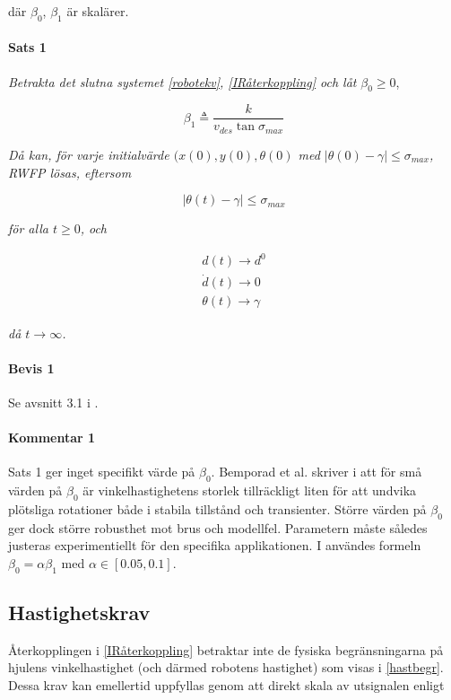 \documentclass[11pt]{article}
\begin{document}
\begin{flushleft}
där $\beta_0$, $\beta_1$ är skalärer.
	
\paragraph{Sats 1} \textit{Betrakta det slutna systemet \eqref{robotekv}, \eqref{IRåterkoppling} och låt} $\beta_0 \geq 0$,

\begin{equation}
	\beta_1 \triangleq \frac {k} {v_{des} \tan \sigma_{max}}
\end{equation}

\textit{Då kan, för varje initialvärde $(x(0), y(0), \theta(0)$ med $| \theta(0) - \gamma| \leq \sigma_{max}$,  RWFP lösas, eftersom}

\begin{equation}
	| \theta(t) - \gamma| \leq \sigma_{max}
\end{equation}

\textit{för alla $t \geq 0$, och}

\begin{equation}
\begin{aligned}
	d(t) \to d^0 \\
	\dot{d}(t) \to 0 \\ 
	\theta(t) \to \gamma 
\end{aligned}
\end{equation}

\textit{då $t \to \infty$.}

\paragraph{Bevis 1} Se avsnitt 3.1 i \cite{wfp}.

\paragraph{Kommentar 1} Sats 1 ger inget specifikt värde på $\beta_0$. Bemporad et al. skriver i \cite{wfp} att för små värden på $\beta_0$ är vinkelhastighetens storlek tillräckligt liten för att undvika plötsliga rotationer både i stabila tillstånd och transienter. Större värden på $\beta_0$ ger dock större robusthet mot brus och modellfel. Parametern måste således justeras experimentiellt för den specifika applikationen. I \cite{wfp} användes formeln $\beta_0 = \alpha \beta_1$ med $\alpha \in [0.05,0.1]$.

\subsection{Hastighetskrav}
Återkopplingen i \eqref{IRåterkoppling} betraktar inte de fysiska begränsningarna på hjulens vinkelhastighet (och därmed robotens hastighet) som visas i \eqref{hastbegr}. Dessa krav kan emellertid uppfyllas genom att direkt skala av utsignalen enligt


\end{flushleft}
\end{document}
